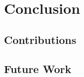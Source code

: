 \chapter{Conclusion}\label{chp:conclusion}

\section{Contributions}
\lipsum[1-4]


\section{Future Work}
\lipsum[2-4]
